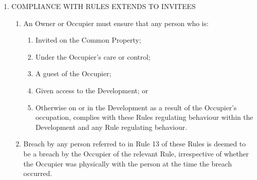 \documentclass{article}
\begin{document}
\begin{enumerate}[label=\arabic*.]
\item  COMPLIANCE WITH RULES EXTENDS TO INVITEES

\begin{enumerate}[label=\arabic{enumi}.\arabic*.]

\item  An Owner or Occupier must ensure that any person who is:

\begin{enumerate}[label=(\arabic*)]

\item  Invited on the Common Property;

\item  Under the Occupier’s care or control;

\item  A guest of the Occupier;

\item  Given access to the Development; or

\item  Otherwise on or in the Development as a result of the Occupier’s occupation, complies with these Rules regulating behaviour within the Development and any Rule regulating behaviour.

\end{enumerate}

\item  Breach by any person referred to in Rule 13 of these Rules is deemed to be a breach by the Occupier of the relevant Rule, irrespective of whether the Occupier was physically with the person at the time the breach occurred.

\end{enumerate}

\end{enumerate}
\end{document}
